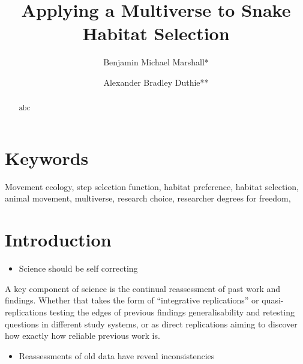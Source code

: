 \documentclass[10pt,a4paper]{article}
\providecommand{\tightlist}{%
  \setlength{\itemsep}{0pt}\setlength{\parskip}{0pt}}
\begin{document}
\pagestyle{fancy}

\title{Applying a Multiverse to Snake Habitat Selection}
\author[1]{Benjamin Michael Marshall*}
\author[1]{Alexander Bradley Duthie**}


\maketitle
\thispagestyle{fancy}

\begin{abstract}

abc

\end{abstract}

\section*{Keywords}

Movement ecology, step selection function, habitat preference, habitat selection, animal movement, multiverse, research choice, researcher degrees for freedom,

\clearpage
\pagestyle{fancy}

\hypertarget{introduction}{%
\section{Introduction}\label{introduction}}

\begin{itemize}
\tightlist
\item
  Science should be self correcting
\end{itemize}

A key component of science is the continual reassessment of past work and findings.
Whether that takes the form of ``integrative replications'' or quasi-replications testing the edges of previous findings generalisability and retesting questions in different study systems, or as direct replications aiming to discover how exactly how reliable previous work is.

\begin{itemize}
\tightlist
\item
  Reassessments of old data have reveal inconsistencies
\end{itemize}
\end{document}
